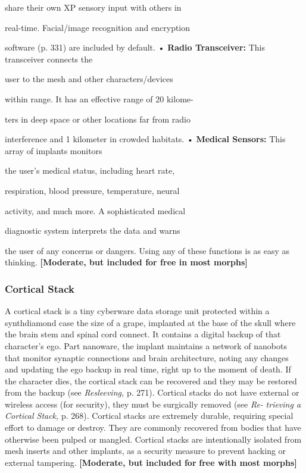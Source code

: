 share their own XP sensory input with others in 

real-time. Facial/image recognition and encryption 

software (p. 331) are included by default.
•  \textbf{Radio Transceiver:} This transceiver connects the 

user to the mesh and other characters/devices 

within range. It has an effective range of 20 kilome-

ters in deep space or other locations far from radio 

interference and 1 kilometer in crowded habitats.
•  \textbf{Medical Sensors:} This array of implants monitors 

the user's medical status, including heart rate, 

respiration, blood pressure, temperature, neural 

activity, and much more. A sophisticated medical 

diagnostic system interprets the data and warns 

the user of any concerns or dangers.
Using any of these functions is as easy as thinking. 
\textbf{[Moderate, but included for free in most morphs]}

\subsubsection{Cortical Stack}

A cortical stack is a tiny cyberware data storage unit 
protected within a synthdiamond case the size of a 
grape, implanted at the base of the skull where the 
brain stem and spinal cord connect. It contains a digital
backup of that character's ego. Part nanoware, the
implant maintains a network of nanobots that monitor
synaptic connections and brain architecture, noting
any changes and updating the ego backup in real time, 
right up to the moment of death. If the character dies, 
the cortical stack can be recovered and they may be 
restored from the backup (see \textit{Resleeving,} p. 271). 
Cortical stacks do not have external or wireless access 
(for security), they must be surgically removed (see \textit{Re-}
\textit{trieving a Cortical Stack,} p. 268). Cortical stacks are 
extremely durable, requiring special effort to damage 
or destroy. They are commonly recovered from bodies 
that have otherwise been pulped or mangled. Cortical 
stacks are intentionally isolated from mesh inserts and 
other implants, as a security measure to prevent hacking
or external tampering. \textbf{[Moderate, but included for }
\textbf{free with most morphs]}

